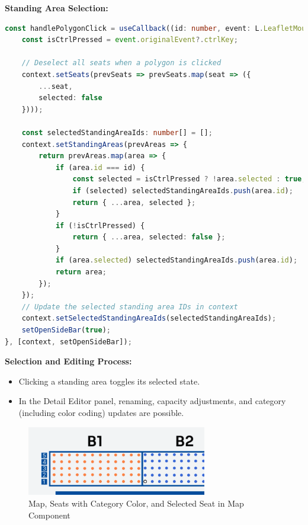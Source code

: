 \textbf{Standing Area Selection:}
\begin{lstlisting}[language=TypeScript, caption=Handling Standing Area Selection, label=lst:select-standingareas]
const handlePolygonClick = useCallback((id: number, event: L.LeafletMouseEvent) => {
    const isCtrlPressed = event.originalEvent?.ctrlKey;

    // Deselect all seats when a polygon is clicked
    context.setSeats(prevSeats => prevSeats.map(seat => ({
        ...seat,
        selected: false
    })));

    const selectedStandingAreaIds: number[] = [];
    context.setStandingAreas(prevAreas => {
        return prevAreas.map(area => {
            if (area.id === id) {
                const selected = isCtrlPressed ? !area.selected : true;
                if (selected) selectedStandingAreaIds.push(area.id);
                return { ...area, selected };
            }
            if (!isCtrlPressed) {
                return { ...area, selected: false };
            }
            if (area.selected) selectedStandingAreaIds.push(area.id);
            return area;
        });
    });
    // Update the selected standing area IDs in context
    context.setSelectedStandingAreaIds(selectedStandingAreaIds);
    setOpenSideBar(true);
}, [context, setOpenSideBar]);
\end{lstlisting}

\textbf{Selection and Editing Process:}
\begin{itemize}
    \item Clicking a standing area toggles its selected state.
    \item In the Detail Editor panel, renaming, capacity adjustments, and category (including color coding) updates are possible.
\end{itemize}

\begin{figure}[H]
    \centering
    \includegraphics[width=0.7\textwidth]{pics/MapComponentCategoryAndSelectedSeat.png}
    \caption{Map, Seats with Category Color, and Selected Seat in Map Component}
    \label{fig:map-component-category}
\end{figure}


